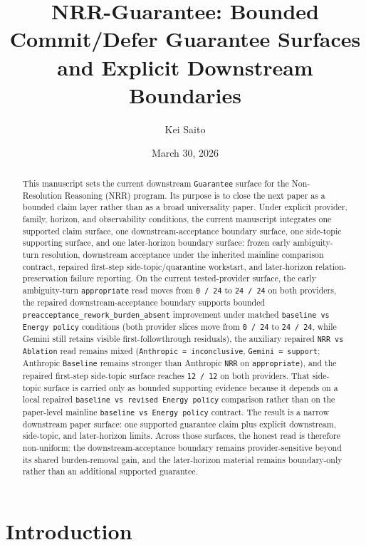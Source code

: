 \documentclass[11pt]{article}
\title{NRR-Guarantee: Bounded Commit/Defer Guarantee Surfaces and Explicit Downstream Boundaries}
\author{Kei Saito}
\date{March 30, 2026}
\begin{document}
\maketitle

\begin{abstract}
This manuscript sets the current downstream \texttt{Guarantee} surface for the
Non-Resolution Reasoning (NRR) program. Its purpose is to close the next paper
as a bounded claim layer rather than as a broad universality paper. Under
explicit provider, family, horizon, and observability conditions, the current
manuscript integrates one supported claim surface, one downstream-acceptance
boundary surface, one side-topic supporting surface, and one later-horizon
boundary surface: frozen early ambiguity-turn resolution, downstream
acceptance under the inherited mainline comparison contract, repaired
first-step side-topic/quarantine workstart, and later-horizon
relation-preservation failure reporting. On the current tested-provider
surface, the early ambiguity-turn \texttt{appropriate} read moves from
\texttt{0 / 24} to \texttt{24 / 24} on both providers, the repaired
downstream-acceptance boundary supports bounded
\texttt{preacceptance\_rework\_burden\_absent} improvement under matched
\texttt{baseline vs Energy policy} conditions (both provider slices move from
\texttt{0 / 24} to \texttt{24 / 24}, while Gemini still retains visible
first-followthrough residuals), the auxiliary repaired
\texttt{NRR vs Ablation} read remains mixed
(\texttt{Anthropic = inconclusive}, \texttt{Gemini = support}; Anthropic
\texttt{Baseline} remains stronger than Anthropic \texttt{NRR} on
\texttt{appropriate}), and the
repaired first-step side-topic surface reaches \texttt{12 / 12} on both
providers. That side-topic surface is carried only as bounded supporting
evidence because it depends on a local repaired
\texttt{baseline vs revised Energy policy} comparison rather than on the
paper-level mainline \texttt{baseline vs Energy policy} contract. The result is
a narrow downstream paper surface: one supported guarantee claim plus explicit
downstream, side-topic, and later-horizon limits. Across those surfaces, the
honest read is therefore non-uniform: the
downstream-acceptance boundary remains provider-sensitive beyond its shared
burden-removal gain, and the later-horizon material remains boundary-only
rather than an additional supported guarantee.
\end{abstract}

\section{Introduction}
\end{document}
